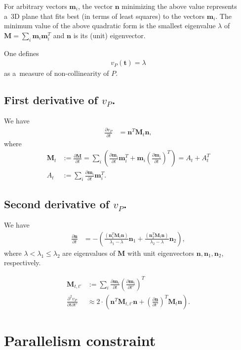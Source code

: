 \documentclass[12pt,a4paper]{amsart}
\renewcommand{\v}[1]{\mathbf{#1}}
\newcommand{\ddd}[2]{\frac{\partial #1}{\partial #2}}
\newcommand{\dddd}[3]{\frac{\partial^2 #1}{\partial #2 \partial #3}}
\begin{document}
For arbitrary vectors $\v{m}_i$, the vector $\v{n}$ minimizing the above value represents a~3D plane that fits best (in terms of least squares) to the vectors $\v{m}_i$.
The minimum value of the above quadratic form is the smallest eigenvalue $\lambda$ of $\v{M} = \sum_i \v{m}_i \v{m}_i^T$ and $\v{n}$ is its (unit) eigenvector.

One defines
\begin{align*}
v_P (\v{t}) = \lambda
\end{align*}
as a~measure of non-collinearity of $P$.

\subsection{First derivative of $v_P$.}

We have
\begin{align*}
\ddd{v_P}{t} & = \v{n}^T \v{M}_t \v{n},
\end{align*}
where
\begin{align*}
\v{M}_t & := \ddd{\v{M}}{t} = \sum_i \left( \ddd{\v{m}_i}{t} \v{m}_i^T + \v{m}_i \left(\ddd{\v{m}_i}{t}\right)^T \right) = A_t + A_t^T \\
A_t & := \sum_i \ddd{\v{m}_i}{t} \v{m}_i^T.
\end{align*}

\subsection{Second derivative of $v_P$.}

We have
\begin{align*}
\ddd{\v{n}}{t} & = - \left( \frac{(\v{n}_1^T\v{M}_t\v{n})}{\lambda_1 - \lambda} \v{n}_1 + \frac{(\v{n}_2^T\v{M}_t\v{n})}{\lambda_2 - \lambda} \v{n}_2 \right),
\end{align*}
where $\lambda < \lambda_1 \leq \lambda_2$ are eigenvalues of $\v{M}$ with unit eigenvectors $\v{n}, \v{n}_1, \v{n}_2$, respectively.

\begin{align*}
\v{M}_{t, t'} & := \sum_i \ddd{\v{m}_i}{t} \left( \ddd{\v{m}_i}{t'} \right)^T \\
\dddd{v_P}{t}{t'} & \approx 2\cdot \left( \v{n}^T \v{M}_{t, t'} \v{n} + \left( \ddd{\v{n}}{t'} \right)^T \v{M}_t \v{n} \right).
\end{align*}

\section{Parallelism constraint}
\end{document}
